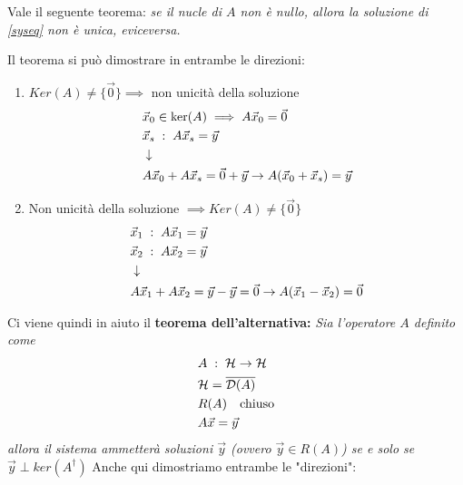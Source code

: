 Vale il seguente teorema: \textit{se il nucle di $A$ non è nullo, allora la soluzione di \ref{syseq} non è unica, eviceversa.}

Il teorema si può dimostrare in entrambe le direzioni:
\begin{enumerate}
	\item $Ker(A) \neq \{\vec{0}\} \implies$ non unicità della soluzione
	\begin{align}
		&\vec{x}_0 \in \ker(A) \implies A \vec{x}_0 =  \vec{0}\\
		&\vec{x}_s \; : \; A \vec{x}_s = \vec{y} \\ &\downarrow \nonumber \\
		& A \vec{x}_0 + A \vec{x}_s =  \vec{0} + \vec{y} \to A(\vec{x}_0 + \vec{x}_s) = \vec{y} 
	\end{align}
	\item Non unicità della soluzione $\implies Ker(A) \neq \{\vec{0}\}$
	\begin{align}
		&\vec{x}_1 \; : \; A \vec{x}_1 = \vec{y} \\
		&\vec{x}_2 \; : \; A \vec{x}_2 = \vec{y} \\ &\downarrow \nonumber \\
		& A \vec{x}_1 + A \vec{x}_2 =  \vec{y} - \vec{y} = \vec{0} \to A(\vec{x}_1 - \vec{x}_2) = \vec{0} 
	\end{align}
\end{enumerate}
Ci viene quindi in aiuto il \textbf{teorema dell'alternativa:} \textit{Sia l'operatore $A$ definito come
	\begin{align}
		&A \; : \; \mathcal{H} \to \mathcal{H}\\
		&\mathcal{H} = \overline{\mathcal{D}(A)}\\
		&R(A) \quad \text{chiuso}\\
		&A \vec{x} = \vec{y} 
	\end{align}	
allora il sistema ammetterà soluzioni $\vec{y}$ (ovvero $\vec{y} \in R(A)$) se e solo se $\vec{y} \perp ker(A^\dagger)$
}
Anche qui dimostriamo entrambe le "direzioni":
